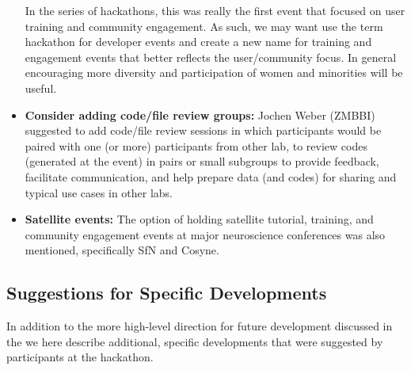 \documentclass{article}
\begin{document}
\begin{itemize}
      In the series of hackathons, this was really the first
      event that focused on user training and community engagement.
      As such, we may want use the term hackathon for
      developer events and create a new name for training and
      engagement events that better reflects the user/community
      focus. In general encouraging more diversity and participation
      of women and minorities will be useful. 
   \item \textbf{Consider adding code/file review groups:}
      Jochen  Weber (ZMBBI) suggested to add code/file review sessions
      in which participants would be paired with one (or more) 
      participants from other lab, to review codes (generated at the 
      event) in pairs or small subgroups to provide feedback, 
      facilitate communication, and help prepare  data (and codes) for
      sharing and typical use cases in other labs.
   \item \textbf{Satellite events:} The option of holding satellite tutorial, training,
      and community engagement events at major neuroscience conferences was also mentioned, 
      specifically SfN and Cosyne. 
\end{itemize}

\subsection{Suggestions for Specific Developments}
\label{sec:es:dev}

In addition to the more high-level direction for future development discussed in the 
 we here describe additional, specific developments that were suggested
by participants at the hackathon. 
\end{document}
